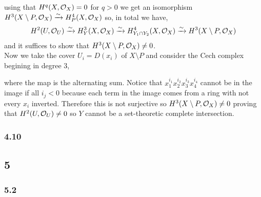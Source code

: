 \documentclass[12pt]{article}
\begin{document}
\begin{center}
\end{center}
using that $H^q(X, \mathcal{O}_{X}) = 0$ for $q > 0$ we get an isomorphism $H^3(X \setminus P, \mathcal{O}_{X}) \xrightarrow{\sim} H^4_P(X, \mathcal{O}_{X})$ so, in total we have, 
\[ H^2(U, \mathcal{O}_{U}) \xrightarrow{\sim} H^3_Y(X, \mathcal{O}_{X}) \xrightarrow{\sim} H^4_{Y_1 \cap Y_2}(X, \mathcal{O}_{X}) \xrightarrow{\sim} H^3(X \setminus P, \mathcal{O}_{X}) \]
and it suffices to show that $H^3(X \setminus P, \mathcal{O}_{X}) \neq 0$.
\bigskip\\
Now we take the cover $U_i = D(x_i)$ of $X \setminus P$ and consider the Cech complex begining in degree $3$,
\begin{center}
\end{center}
where the map is the alternating sum. Notice that $x_1^{i_1} x_2^{i_2} x_3^{i_3} x_4^{i_4}$ cannot be in the image if all $i_j < 0$ because each term in the image comes from a ring with not every $x_i$ inverted. Therefore this is not surjective so $H^3(X \setminus P, \mathcal{O}_{X}) \neq 0$ proving that $H^2(U, \mathcal{O}_{U}) \neq 0$ so $Y$ cannot be a set-theoretic complete intersection. 

\subsubsection{4.10}

\subsection{5}

\subsubsection{5.2}
\end{document}
